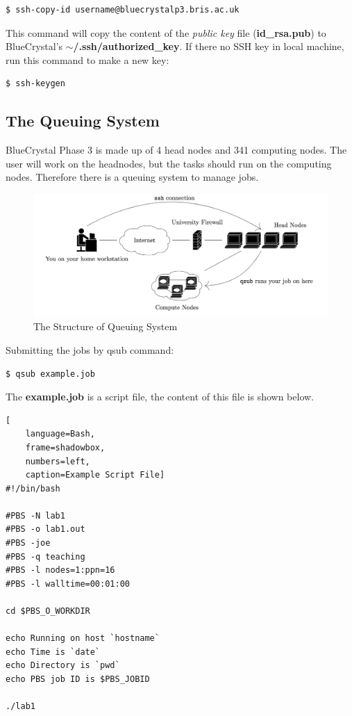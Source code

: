 \documentclass{article}
\begin{document}
\begin{lstlisting}[language=Bash]
    $ ssh-copy-id username@bluecrystalp3.bris.ac.uk
\end{lstlisting}

\noindent This command will copy the content of the \textit{public key} file (\textbf{id\_rsa.pub}) to BlueCrystal's \textbf{$\sim$/.ssh/authorized\_key}. If there no SSH key in local machine, run this command to make a new key:

\begin{lstlisting}[language=Bash]
    $ ssh-keygen
\end{lstlisting}


\subsection{The Queuing System}

BlueCrystal Phase 3 is made up of 4 head nodes and 341 computing nodes. The user will work on the headnodes, but the tasks should run on the computing nodes. Therefore there is a queuing system to manage jobs.

\begin{figure}[h]
    \centering
    \includegraphics[scale=0.4]{images/structure-of-queue.png}
    \caption{The Structure of Queuing System}
    \label{fig:my_label}
\end{figure}

Submitting the jobs by qsub command:

\begin{lstlisting}[language=Bash]
    $ qsub example.job
\end{lstlisting}

\noindent The \textbf{example.job} is a script file, the content of this file is shown below.

\begin{lstlisting}[
    language=Bash,
    frame=shadowbox,
    numbers=left,
    caption=Example Script File]
#!/bin/bash

#PBS -N lab1
#PBS -o lab1.out
#PBS -joe
#PBS -q teaching
#PBS -l nodes=1:ppn=16
#PBS -l walltime=00:01:00

cd $PBS_O_WORKDIR

echo Running on host `hostname`
echo Time is `date`
echo Directory is `pwd`
echo PBS job ID is $PBS_JOBID

./lab1
\end{lstlisting}
\end{document}
